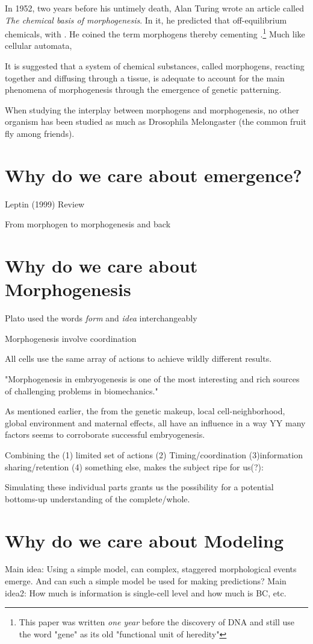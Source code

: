 In 1952, two years before his untimely death, Alan Turing wrote an article called
\textit{The chemical basis of morphogenesis}.\cite{turing52the} In it, he predicted that off-equilibrium chemicals, with . He coined the term morphogens thereby cementing .\footnote{This paper was written \textit{one year} before the discovery of DNA and still use the word "gene" as its old "functional unit of heredity"} Much like cellular automata, 



It is suggested that a system of chemical substances, called morphogens, reacting together and diffusing through a tissue, is adequate to account for the main phenomena of morphogenesis through the emergence of genetic patterning.

When studying the interplay between morphogens and morphogenesis, no other organism has been studied as much as Drosophila Melongaster (the common fruit fly among friends).



\section{Why do we care about emergence?}
Leptin (1999) Review

From morphogen to morphogenesis and back
\section{Why do we care about Morphogenesis}
Plato used the words \textit{form} and \textit{idea} interchangeably

Morphogenesis involve coordination

All cells use the same array of actions to achieve wildly different results.  

"Morphogenesis in embryogenesis is one of the most interesting and rich sources of challenging problems in biomechanics."

As mentioned earlier, the  from the genetic makeup, local cell-neighborhood, global environment and maternal effects, all have an influence in a way YY many factors seems to corroborate successful embryogenesis. 

Combining the (1) limited set of actions (2) Timing/coordination (3)information sharing/retention (4) something else, makes the subject ripe for us(?):

Simulating these individual parts grants us the possibility for a potential bottoms-up understanding of the complete/whole.



\section{Why do we care about Modeling}
Main idea: Using a simple model, can complex, staggered morphological events emerge. And can such a simple model be used for making predictions?
Main idea2: How much is information is single-cell level and how much is BC, etc.